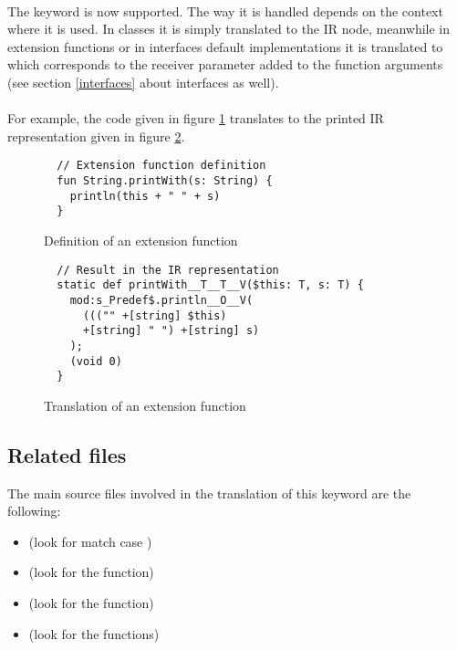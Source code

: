 \paragraph{} The keyword  is now supported. The way it is handled depends on the 
context where it is used. In classes it is simply translated to the  IR node, 
meanwhile in extension functions or in interfaces default implementations it is translated to 
 which corresponds to the receiver parameter added to the 
function arguments (see section \ref{interfaces} about interfaces as well).

\paragraph{} For example, the code given in figure \ref{extension_example} translates to the 
printed IR representation given in figure \ref{extension_IR_example}.
\begin{figure}[h]
  \begin{verbatim}
  // Extension function definition
  fun String.printWith(s: String) {
    println(this + " " + s)
  }
  \end{verbatim}
  
  \caption{Definition of an extension function}
  \label{extension_example}
\end{figure}

\begin{figure}[h]
  \begin{verbatim}  
  // Result in the IR representation
  static def printWith__T__T__V($this: T, s: T) {
    mod:s_Predef$.println__O__V(
      ((("" +[string] $this)
      +[string] " ") +[string] s)
    );
    (void 0)
  }
  \end{verbatim}
  
  \caption{Translation of an extension function}
  \label{extension_IR_example}
\end{figure}

\subsection{Related files} The main source files involved in the translation of this keyword are 
the following:

\begin{itemize}
 \item {} (look for match case )
 \item {} (look for the  function)
 \item {} (look for the  function)
 \item {} (look for the  functions)
\end{itemize}


